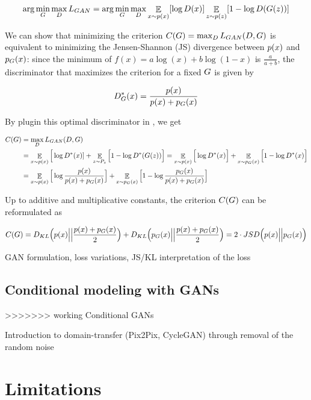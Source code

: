 \begin{equation}
\label{eq:GAN_problem}
\arg\min_G\max_DL_{GAN} = \arg\min_G\max_D \mathop{\mathbb{E}}_{x\sim p(x)} [\log D(x)]  \mathop{\mathbb{E}}_{z\sim p(z)} [1 - \log D(G(z))]
\end{equation}

We can show that minimizing the criterion $C( G) = \max_DL_{GAN}(D, G)$ is equivalent to minimizing the Jensen-Shannon (\ac{JS}) divergence between $p(x)$ and $p_G(x)$\cite{Goodfellow2014}: since the minimum of $f(x) = a\log(x) + b\log(1-x)$ is $\frac{a}{a+b}$, the discriminator that maximizes the criterion for a fixed $G$ is given by

\begin{equation}
D^*_G(x) = \frac{p(x)}{p(x) + p_G(x)}
\end{equation}

By plugin this optimal discriminator in , we get

\begin{align}
		C( G) &= \max_DL_{GAN}(D, G) \nonumber\\
		& = \mathop{\mathbb{E}}_{x\sim p(x)} \Big[\log D^*(x)] +  \mathop{\mathbb{E}}_{z\sim P_z} \Big[1 - \log D^*(G(z))\Big] \nonumber = \mathop{\mathbb{E}}_{x\sim p(x)} \Big[\log D^*(x)\Big] +  \mathop{\mathbb{E}}_{{x}\sim p_G(x)} \Big[1 - \log D^*(x)\Big] \nonumber \\
		& = \mathop{\mathbb{E}}_{x\sim p(x)} \Big[\log \frac{p(x)}{p(x) + p_G(x)}\Big] +   \mathop{\mathbb{E}}_{{x}\sim p_G(x)} \Big[1 - \log  \frac{p_G(x)}{p(x) + p_G(x)}\Big] \nonumber \\
\end{align}

Up to additive and multiplicative constants, the criterion  $C(G)$ can be reformulated as

\begin{equation}
		C(G) = D_{KL} \Big(p(x)\Big|\Big|\frac{p(x)+p_G(x)}{2} \Big) + D_{KL} \Big(p_G(x) \Big|\Big| \frac{p(x)+p_G(x)}{2} \Big) = 2\cdot JSD \Big(p(x)\Big|\Big|p_G(x) \Big)
\end{equation}

GAN formulation, loss variations, JS/KL interpretation of the loss

\subsection{Conditional modeling with  \ac{GAN}s}
>>>>>>> working
Conditional GANs

Introduction to domain-transfer (Pix2Pix, CycleGAN) through removal of the random noise

\section{Limitations}

